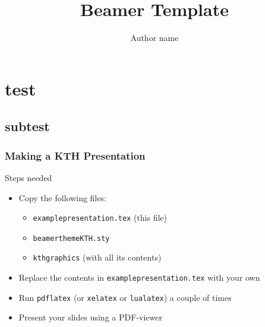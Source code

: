 \documentclass[aspectratio=169]{beamer}
\title{Beamer Template}
\author{Author name}
\begin{document}
\startpage

\begin{frame}[plain]
  \titlepage
\end{frame}


\section{test}

\subsection{subtest}

\normalpage
\begin{frame}
  \frametitle{Making a KTH Presentation}

  \begin{block}{Steps needed}
    \begin{itemize}
    \item Copy the following files:
    \begin{itemize}
    \item \texttt{examplepresentation.tex} (this file)
    \item \texttt{beamerthemeKTH.sty}
    \item \texttt{kthgraphics} (with all its contents)
    \end{itemize}
    \item Replace the contents in \texttt{examplepresentation.tex} with your own
    \item Run \texttt{pdflatex} (or \texttt{xelatex} or \texttt{lualatex}) a couple of times
    \item Present your slides using a PDF-viewer
    \end{itemize}
  \end{block}

\end{frame}
\end{document}
